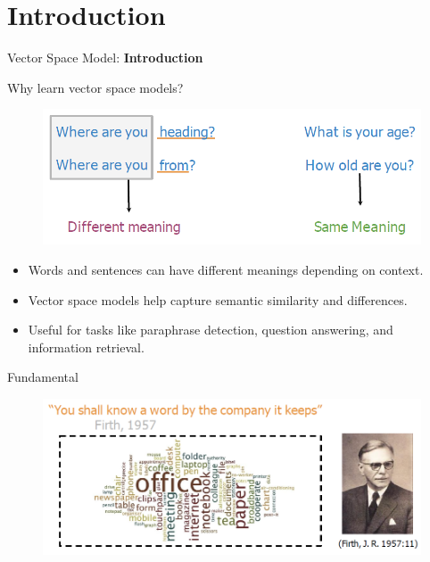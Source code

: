 \section{Introduction}
\begin{frame}{}
    \LARGE Vector Space Model: \textbf{Introduction}
\end{frame}

\begin{frame}{Why learn vector space models?}
    \begin{figure}
        \centering
        \includegraphics[width=\textwidth,height=0.8\textheight,keepaspectratio]{images/vector-space/why-vector-space.png}
    \end{figure}
    \begin{itemize}
        \item Words and sentences can have different meanings depending on context.
        \item Vector space models help capture semantic similarity and differences.
        \item Useful for tasks like paraphrase detection, question answering, and information retrieval.
    \end{itemize}
\end{frame}

\begin{frame}{Fundamental}
    \begin{figure}
        \centering
        \includegraphics[width=\textwidth,height=0.8\textheight,keepaspectratio]{images/vector-space/vector-space-funda.png}
    \end{figure}
\end{frame}

